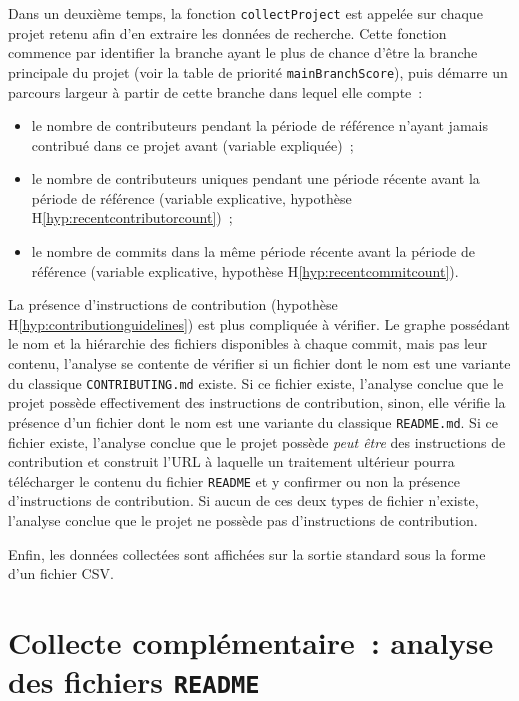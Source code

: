 Dans un deuxième temps, la fonction \texttt{collectProject} est appelée sur chaque projet retenu afin d'en
extraire les données de recherche. Cette fonction commence par identifier la branche ayant le plus de chance
d'être la branche principale du projet (voir la table de priorité \texttt{mainBranchScore}), puis démarre un
parcours largeur à partir de cette branche dans lequel elle compte :

\begin{itemize}
    \item le nombre de contributeurs pendant la période de référence n'ayant jamais contribué dans ce projet
        avant (variable expliquée) ;
    \item le nombre de contributeurs uniques pendant une période récente avant la période de référence
        (variable explicative, hypothèse H\ref{hyp:recentcontributorcount}) ;
    \item le nombre de \glspl{commit} dans la même période récente avant la période de référence (variable
        explicative, hypothèse H\ref{hyp:recentcommitcount}).
\end{itemize}

La présence d'instructions de contribution (hypothèse H\ref{hyp:contributionguidelines}) est plus compliquée à
vérifier. Le graphe possédant le nom et la hiérarchie des fichiers disponibles à chaque \gls{commit}, mais pas
leur contenu, l'analyse se contente de vérifier si un fichier dont le nom est une variante du classique
\texttt{CONTRIBUTING.md} existe. Si ce fichier existe, l'analyse conclue que le projet possède effectivement
des instructions de contribution, sinon, elle vérifie la présence d'un fichier dont le nom est une variante du
classique \texttt{README.md}. Si ce fichier existe, l'analyse conclue que le projet possède \emph{peut être}
des instructions de contribution et construit l'URL à laquelle un traitement ultérieur pourra télécharger le
contenu du fichier \texttt{README} et y confirmer ou non la présence d'instructions de contribution. Si aucun
de ces deux types de fichier n'existe, l'analyse conclue que le projet ne possède pas d'instructions de
contribution.

Enfin, les données collectées sont affichées sur la sortie standard sous la forme d'un fichier CSV.

\section{Collecte complémentaire : analyse des fichiers \texttt{README}}
\label{app:checkreadme.py}

